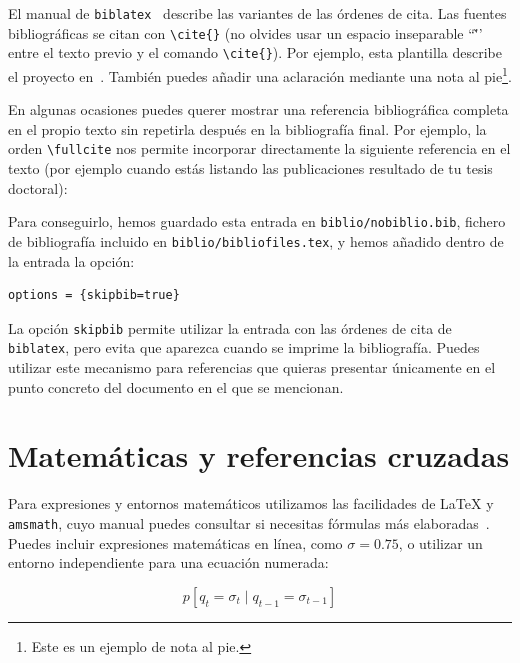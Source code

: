 El manual de \texttt{biblatex}~\cite{biblatex-manual} describe las variantes de las órdenes de cita. Las fuentes bibliográficas se citan con \texttt{\textbackslash{}cite\{\}} (no olvides usar un espacio inseparable ``\~'' entre el texto previo y el comando \texttt{\textbackslash{}cite\{\}}). Por ejemplo, esta plantilla describe el proyecto \texis{} en~\cite{texis}. También puedes añadir una aclaración mediante una nota al pie\footnote{Este es un ejemplo de nota al pie.}.

En algunas ocasiones puedes querer mostrar una referencia bibliográfica completa en el propio texto sin repetirla después en la bibliografía final. Por ejemplo, la orden \texttt{\textbackslash{}fullcite} nos permite incorporar directamente la siguiente referencia en el texto (por ejemplo cuando estás listando las publicaciones resultado de tu tesis doctoral):


Para conseguirlo, hemos guardado esta entrada en \texttt{biblio/nobiblio.bib}, fichero de bibliografía incluido en \texttt{biblio/bibliofiles.tex}, y hemos añadido dentro de la entrada la opción:

\begin{verbatim}
options = {skipbib=true}
\end{verbatim}

La opción \texttt{skipbib} permite utilizar la entrada con las órdenes de cita de \texttt{biblatex}, pero evita que aparezca cuando se imprime la bibliografía. Puedes utilizar este mecanismo para referencias que quieras presentar únicamente en el punto concreto del documento en el que se mencionan.

\section{Matemáticas y referencias cruzadas}
\label{sec:matematicas-referencias}

Para expresiones y entornos matemáticos utilizamos las facilidades de \LaTeX{} y \texttt{amsmath}, cuyo manual puedes consultar si necesitas fórmulas más elaboradas~\cite{amsmath-manual}. Puedes incluir expresiones matemáticas en línea, como $\sigma=0.75$, o utilizar un entorno independiente para una ecuación numerada:

\begin{equation}
  \label{eq:ejemplo-basico}
  p[q_t=\sigma_t\mid q_{t-1}=\sigma_{t-1}]
\end{equation}

